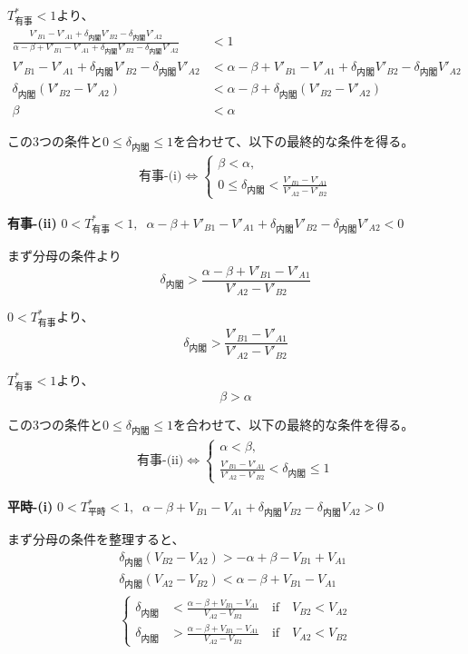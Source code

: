 \documentclass[main.tex]{subfiles}
\begin{document}
$T^*_{有事}<1$より、
\begin{align*}
    \frac{ V'_{B1} - V'_{A1} +\delta_{内閣}V'_{B2} - \delta_{内閣}V'_{A2} }{ \alpha-\beta + V'_{B1}-V'_{A1} + \delta_{内閣}V'_{B2} - \delta_{内閣}V'_{A2} } &< 1\\
    V'_{B1} - V'_{A1} +\delta_{内閣}V'_{B2} - \delta_{内閣}V'_{A2} &< \alpha-\beta + V'_{B1}-V'_{A1} + \delta_{内閣}V'_{B2} - \delta_{内閣}V'_{A2}\\
    \delta_{内閣}(V'_{B2} - V'_{A2}) &< \alpha-\beta + \delta_{内閣}(V'_{B2} - V'_{A2})\\
    \beta &< \alpha
\end{align*}

この3つの条件と$0 \le \delta_{内閣} \le 1$を合わせて、以下の最終的な条件を得る。
\begin{align*}
    \text{有事-(i)} \Leftrightarrow 
    \begin{cases}
        \beta < \alpha, \\
        0 \le \delta_{内閣} < \frac{V'_{B1}-V'_{A1}}{V'_{A2} - V'_{B2}}
    \end{cases}
\end{align*}



\bigskip
\noindent
\textbf{有事-(ii)}\; $0<T^*_{有事}<1,\;\; \alpha-\beta + V'_{B1}-V'_{A1} + \delta_{内閣}V'_{B2} - \delta_{内閣}V'_{A2} < 0$

まず分母の条件より
$$\delta_{内閣} > \frac{\alpha-\beta + V'_{B1}-V'_{A1}}{V'_{A2} - V'_{B2}}$$

$0<T^*_{有事}$より、
$$\delta_{内閣} > \frac{V'_{B1} - V'_{A1}}{V'_{A2} - V'_{B2}}$$

$T^*_{有事}<1$より、
$$\beta > \alpha$$

この3つの条件と$0 \le \delta_{内閣} \le 1$を合わせて、以下の最終的な条件を得る。
\begin{align*}
    \text{有事-(ii)} \Leftrightarrow 
    \begin{cases}
        \alpha < \beta, \\
        \frac{V'_{B1}-V'_{A1}}{V'_{A2} - V'_{B2}} < \delta_{内閣} \le 1
    \end{cases}
\end{align*}


\bigskip
\noindent
\textbf{平時-(i)}\; $0<T^*_{平時}<1,\;\; \alpha-\beta + V_{B1}-V_{A1} + \delta_{内閣}V_{B2} - \delta_{内閣}V_{A2} > 0$

まず分母の条件を整理すると、
\begin{align*}
    \delta_{内閣}(V_{B2} - V_{A2}) > -\alpha+\beta - V_{B1}+V_{A1} \\
    \delta_{内閣}(V_{A2} - V_{B2}) < \alpha-\beta + V_{B1}-V_{A1}\\
    \begin{cases}
        \delta_{内閣} &< \frac{\alpha-\beta + V_{B1}-V_{A1}}{V_{A2} - V_{B2}} \quad\text{if}\quad V_{B2} < V_{A2}\\
        \delta_{内閣} &> \frac{\alpha-\beta + V_{B1}-V_{A1}}{V_{A2} - V_{B2}} \quad\text{if}\quad V_{A2} < V_{B2}
    \end{cases}
\end{align*}
\end{document}
